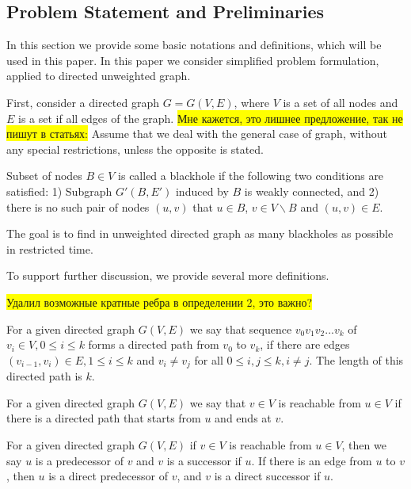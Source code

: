 \documentclass{svproc}
\newcommand{\FIXME}[1]{ %
	\colorbox{yellow}{#1}
}
\newcommand{\FIXME}[1]{ %
}
\begin{document}
\subsection{Problem Statement and Preliminaries}
In this section we provide some basic notations and definitions, which will be used in this paper. In this paper we consider simplified problem formulation, applied to directed unweighted graph.

First, consider a directed graph $G = G(V,E)$, where $V$ is a set of all nodes and $E$ is a set if all edges of the graph. 
\FIXME{Мне кажется, это лишнее предложение, так не пишут в статьях:} Assume that we deal with the general case of graph, without any special restrictions, unless the opposite is stated. 

\begin{definition}
Subset of nodes $B \in V$ is called a blackhole if  the following two conditions are satisfied: 
1) Subgraph $G'(B, E')$ induced by $B$ is weakly connected, 
and
2) there is no such pair of nodes $(u,v)$ that $u \in B$, $v \in V \backslash B$ and $(u,v) \in E$.
\end{definition}

The goal is to find in unweighted directed graph as many blackholes as possible in restricted time.

To support further discussion, we provide several more definitions.

\FIXME{Удалил возможные кратные ребра в определении 2, это важно?}
\begin{definition}
For a given directed graph $G(V,E)$ we say that sequence $v_0v_1v_2...v_{k}$ of $v_i \in V, 0 \leq i \leq k$ forms a directed path from $v_0$ to $v_k$, if there are edges $(v_{i-1}, v_i) \in E, 1 \leq i \leq k$ and $v_i \neq v_j$ for all $0 \leq i, j \leq k, i \neq j$. The length of this directed path is $k$.
\end{definition}

\begin{definition}
For a given directed graph $G(V,E)$ we say that $v \in V$ is reachable from $u \in V$ if there is a directed path that starts from $u$ and ends at $v$.
\end{definition}

\begin{definition}
For a given directed graph $G(V,E)$ if $v \in V$ is reachable from $u \in V$, then we say $u$ is a predecessor of $v$ and $v$ is a successor if $u$.
If there is an edge from $u$ to $v$, then $u$ is a direct predecessor of $v$, and $v$ is a direct successor if $u$.
\end{definition}
\end{document}
